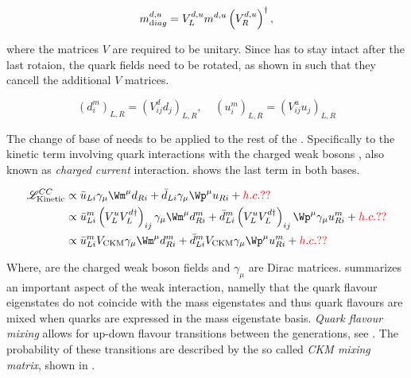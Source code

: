\begin{equation}
  m^{d,u}_{\text diag} = V_L^{d,u} m^{d,u} \left(V_R^{d,u}\right)^{\dagger},
  \label{diagM}
\end{equation}

\noindent where the matrices $V$ are required to be unitary. Since  has to stay intact after the last
rotaion, the quark fields need to be rotated, as shown in  such that they cancell the additional $V$ matrices.

\begin{equation}
  \left( d_{i}^m \right)_{L,R} = \left( V^d_{ij} d_{j} \right)_{L,R}, \;\;\;\; \left( u_{i}^m \right)_{L,R} = \left( V^u_{ij} u_{j} \right)_{L,R}
  \label{quark_rotation}
\end{equation}

The change of base of  needs to be applied to the rest of the . Specifically
to the kinetic term involving quark interactions with the charged weak bosons \Wpm, also known as {\it charged current}
interaction.  shows the last term in both bases.

\begin{align}
  \mathscr{L}_{\text{Kinetic}}^{CC} &\propto \bar{u}_{Li} \gamma_\mu {\Wm}^\mu d_{Ri} + \bar{d}_{Li} \gamma_\mu {\Wp}^\mu u_{Ri} + {\color{red} h.c.??}  \\
                               &\propto \bar{u}_{Li}^m \left( V^u_LV^{d\dagger}_L\right)_{ij} \gamma_\mu {\Wm}^\mu d_{Ri}^m + \bar{d}_{Li}^m \left( V^u_LV^{d\dagger}_L\right)_{ij} {\Wp}^\mu \gamma_\mu u_{Ri}^m + {\color{red} h.c.??} \nonumber \\
                               &\propto \bar{u}_{Li}^m V_{\text{CKM}} \gamma_\mu {\Wm}^\mu d_{Ri}^m + \bar{d}_{Li}^m V_{\text{CKM}} \gamma_\mu {\Wp}^\mu u_{Ri}^m + {\color{red} h.c.??}
  \label{CClagrangian}
\end{align}

\noindent Where, \Wpm are the charged weak boson fields and $\gamma_\mu$ are Dirac matrices.
 summarizes an important aspect of the weak interaction, namelly that the quark flavour eigenstates
do not coincide with the mass eigenstates and thus quark flavours are mixed when quarks are expressed in the mass eigenstate basis.
{\it Quark flavour mixing} allows for up-down flavour transitions between the generations, see .
The probability of these transitions are described by the so called {\it CKM mixing matrix}, shown in .

